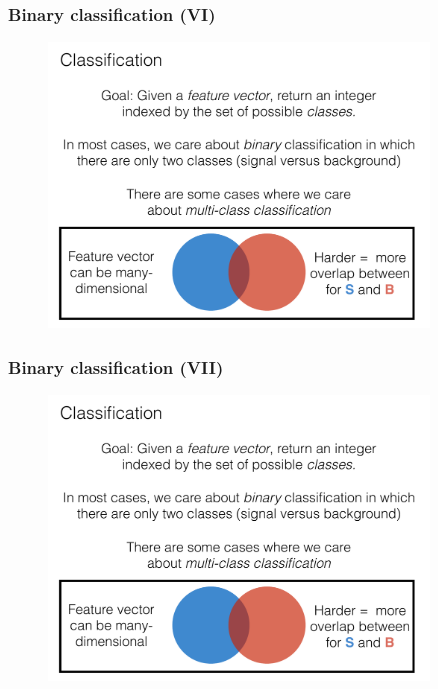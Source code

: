 \documentclass[hyperref={colorlinks=true}]{beamer}
\begin{document}

\begin{frame}%
  \frametitle{Binary classification (VI)}

  \vspace{-0.0cm}

  \begin{figure}
    \centering 
    \includegraphics[width=0.9\textwidth,page=8]{ClassifierSlides.pdf}
  \end{figure}

    
\end{frame}


\begin{frame}%
  \frametitle{Binary classification (VII)}

  \vspace{-0.0cm}

  \begin{figure}
    \centering 
    \includegraphics[width=0.9\textwidth,page=9]{ClassifierSlides.pdf}
  \end{figure}

    
\end{frame}
\end{document}
